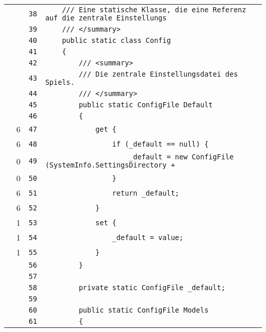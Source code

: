 \documentclass[a4paper,10pt]{article}
\begin{document}
\begin{longtable}[l]{lrrl}
\cellcolor{gray} &  & \verb~38~ & \verb~    /// Eine statische Klasse, die eine Referenz auf die zentrale Einstellungs~\\
\cellcolor{gray} &  & \verb~39~ & \verb~    /// </summary>~\\
\cellcolor{gray} &  & \verb~40~ & \verb~    public static class Config~\\
\cellcolor{gray} &  & \verb~41~ & \verb~    {~\\
\cellcolor{gray} &  & \verb~42~ & \verb~        /// <summary>~\\
\cellcolor{gray} &  & \verb~43~ & \verb~        /// Die zentrale Einstellungsdatei des Spiels.~\\
\cellcolor{gray} &  & \verb~44~ & \verb~        /// </summary>~\\
\cellcolor{gray} &  & \verb~45~ & \verb~        public static ConfigFile Default~\\
\cellcolor{gray} &  & \verb~46~ & \verb~        {~\\
\cellcolor{green} & 6 & \verb~47~ & \verb~            get {~\\
\cellcolor{green} & 6 & \verb~48~ & \verb~                if (_default == null) {~\\
\cellcolor{red} & 0 & \verb~49~ & \verb~                    _default = new ConfigFile (SystemInfo.SettingsDirectory + ~\\
\cellcolor{red} & 0 & \verb~50~ & \verb~                }~\\
\cellcolor{green} & 6 & \verb~51~ & \verb~                return _default;~\\
\cellcolor{green} & 6 & \verb~52~ & \verb~            }~\\
\cellcolor{green} & 1 & \verb~53~ & \verb~            set {~\\
\cellcolor{green} & 1 & \verb~54~ & \verb~                _default = value;~\\
\cellcolor{green} & 1 & \verb~55~ & \verb~            }~\\
\cellcolor{gray} &  & \verb~56~ & \verb~        }~\\
\cellcolor{gray} &  & \verb~57~ & \verb~~\\
\cellcolor{gray} &  & \verb~58~ & \verb~        private static ConfigFile _default;~\\
\cellcolor{gray} &  & \verb~59~ & \verb~~\\
\cellcolor{gray} &  & \verb~60~ & \verb~        public static ConfigFile Models~\\
\cellcolor{gray} &  & \verb~61~ & \verb~        {~\\

\end{longtable}
\end{document}
